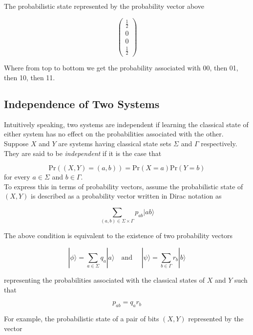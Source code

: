 \documentclass[svgnames]{article}     %
\begin{document}
The probabilistic state represented by the probability vector above 

\[
\begin{pmatrix}
  \frac{1}{2}\\ 0 \\ 0 \\ \frac{1}{2}
\end{pmatrix}
\] \vspace{5px}

Where from top to bottom we get the probability associated with 00, then 01,
then 10, then 11. 

\subsection{Independence of Two Systems}

Intuitively speaking, two systems are independent if learning the classical
state of either system has no effect on the probabilities associated with the
other. \\

Suppose $X$ and $Y$ are systems having classical state sets $\Sigma$ and
$\Gamma$ respectively. They are said to be \textit{independent} if it is the
case that 

\[
\text{Pr}((X, Y) = (a, b)) = \text{Pr}(X = a)\text{Pr}(Y=b)
\] \vspace{5px}
for every $a \in \Sigma$ and $b \in \Gamma$. \\

To express this in terms of probability vectors, assume the probabilistic state
of $(X, Y)$ is described as a probability vector written in Dirac notation as 

\[
  \sum_{(a,b)\in \Sigma \times \Gamma} p_{ab} |ab\rangle
\] \vspace{5px}

The above condition is equivalent to the existence of two probability vectors 

\[
  |\phi\rangle = \sum_{a\in\Sigma} q_a |a\rangle \quad \text{and } \quad
  |\psi\rangle = \sum_{b\in\Gamma} r_b|b\rangle
\] \vspace{5px}

representing the probabilities associated with the classical states of $X$ and
$Y$ such that 

\[
  p_{ab} = q_a r_b
\] \vspace{5px}

For example, the probabilistic state of a pair of bits $(X,Y)$ represented by
the vector 
\end{document}
